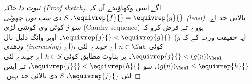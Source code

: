 \documentclass[../../../include/open-logic-section]{subfiles}
\begin{document}
\begin{proof}[ثبوت دا خاکہ (Proof sketch)]
اگے اسی وکھاؤندے آں کہ $\equivrep{f}{} = \equivrep{g}{}$، $S$ دی
\emph{سب توں چھوٹی (least)} بالائی حد اے۔ سو $j$ کوئی وی کوشی لڑی
(Cauchy sequence) ہووے تے
فرض کرو کہ $\equivrep{j}{} < \equivrep{g}{}$۔ اوپر وانگ دلیل نال
(ایہ حقیقت ورت کے کہ $g$ \emph{ودھدی (increasing)} اے)، کوئی $n \in \Nat$ اے
جیہدے لئی $\equivrep{j}{} < (g(n))_\Real$۔ پر بناوٹ مطابق کوئی
$h \in S$ اے جیہدے لئی $(g(n))_\Real \leq \equivrep{h}{}$، سو
$\equivrep{j}{} < \equivrep{h}{}$، تے ایس لئی $\equivrep{j}{}$،
$S$ دی بالائی حد نہیں۔
\end{proof}
\end{document}
